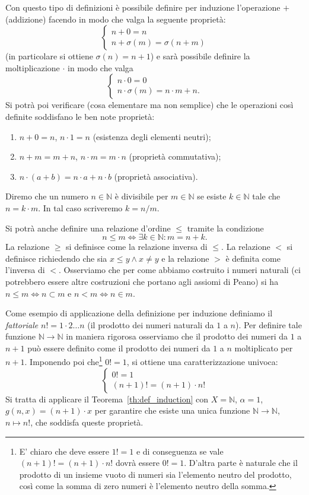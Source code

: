 \documentclass[italian,a4paper,hidelinks,headinclude]{scrartcl}
\newcommand{\NN}{{\mathbb N}}
\begin{document}
Con questo tipo di definizioni è possibile definire per induzione
l'operazione $+$ (addizione)
facendo in modo che valga la seguente proprietà:
\[
\begin{cases}
  n + 0 = n\\
  n + \sigma(m) = \sigma(n+m)
\end{cases}
\]
(in particolare si ottiene $\sigma(n)=n+1$)
e sarà possibile definire la moltiplicazione $\cdot$ in modo che
valga
\[
\begin{cases}
  n\cdot 0 = 0 \\
  n \cdot \sigma(m) = n\cdot m + n.
\end{cases}
\]
Si potrà poi verificare (cosa elementare ma non semplice)
che le operazioni così definite soddisfano le ben
note proprietà:
\begin{enumerate}
\item $n+0=n$, $n\cdot 1 = n$ (esistenza degli elementi neutri);
\item $n+m = m+n$, $n\cdot m = m\cdot n$ (proprietà commutativa);
\item $n\cdot (a+b) = n\cdot a + n\cdot b$ (proprietà associativa).
\end{enumerate}

Diremo che un numero $n\in \NN$ è divisibile per $m\in \NN$ se esiste $k\in \NN$
tale che $n = k \cdot m$. In tal caso scriveremo $k = n/m$.

Si potrà anche definire una relazione d'ordine $\le$ tramite la condizione
\[
  n \le m \iff \exists k \in \NN \colon m = n+k.
\]
La relazione $\ge$ si definisce come la relazione inversa di $\le$.
La relazione $<$ si
definisce richiedendo che sia $x\le y \land x\neq y$ e la relazione $>$
è definita come l'inversa di $<$.
Osserviamo che per come abbiamo costruito i numeri naturali (ci potrebbero essere
altre costruzioni che portano agli assiomi di Peano) si ha $n\le m \iff n \subset m$
e $n < m \iff n\in m$.

Come esempio di applicazione della definizione per induzione definiamo
il \emph{fattoriale} $n! = 1 \cdot 2 \dots n$ (il prodotto dei numeri naturali
da $1$ a $n$).
Per definire tale funzione
$\NN \to \NN$ in maniera rigorosa osserviamo che il prodotto dei numeri da $1$
a $n+1$ può essere definito come il prodotto dei numeri da $1$ a $n$ moltiplicato
per $n+1$. Imponendo poi che\footnote{%
E' chiaro che deve essere $1!=1$ e di conseguenza se vale $(n+1)! = (n+1)\cdot n!$
dovrà essere $0!=1$.
D'altra parte è naturale che il prodotto di un insieme vuoto di numeri sia
l'elemento neutro del prodotto, così come la somma di zero numeri è l'elemento
neutro della somma.
}
$0!=1$, si ottiene una caratterizzazione univoca:
\[
 \begin{cases}
  0! = 1 \\
  (n+1)! = (n+1) \cdot n!
 \end{cases}
\]
Si tratta di applicare il Teorema~\ref{th:def_induction}
con $X=\NN$, $\alpha = 1$, $g(n, x) = (n+1)\cdot x$ per garantire che esiste
una unica funzione $\NN\to\NN$, $n\mapsto n!$, che soddisfa queste proprietà.
\end{document}
